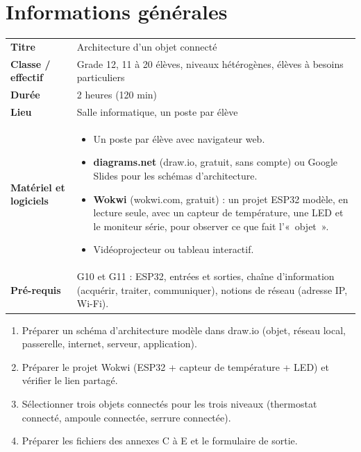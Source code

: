 \documentclass[11pt,a4paper]{article}
\begin{document}

\section{Informations générales}
\begin{tabularx}{\linewidth}{>{\bfseries}p{3.6cm}Y}
\toprule
Titre & Architecture d'un objet connecté\\
Classe / effectif & Grade 12, 11 à 20 élèves, niveaux hétérogènes, élèves à besoins particuliers\\
Durée & 2 heures (120 min)\\
Lieu & Salle informatique, un poste par élève\\
Matériel et logiciels &
\begin{itemize}
 \item Un poste par élève avec navigateur web.
 \item \textbf{diagrams.net} (draw.io, gratuit, sans compte) ou Google Slides pour les schémas d'architecture.
 \item \textbf{Wokwi} (wokwi.com, gratuit) : un projet ESP32 modèle, en lecture seule, avec un capteur de température, une LED et le moniteur série, pour observer ce que fait l'«~objet~».
 \item Vidéoprojecteur ou tableau interactif.
\end{itemize}\\
Pré-requis &
G10 et G11 : ESP32, entrées et sorties, chaîne d'information (acquérir, traiter, communiquer), notions de réseau (adresse IP, Wi-Fi).\\
\bottomrule
\end{tabularx}

\begin{astuce}
\begin{enumerate}
 \item Préparer un schéma d'architecture modèle dans draw.io (objet, réseau local, passerelle, internet, serveur, application).
 \item Préparer le projet Wokwi (ESP32 + capteur de température + LED) et vérifier le lien partagé.
 \item Sélectionner trois objets connectés pour les trois niveaux (thermostat connecté, ampoule connectée, serrure connectée).
 \item Préparer les fichiers des annexes C à E et le formulaire de sortie.
\end{enumerate}
\end{astuce}
\end{document}

